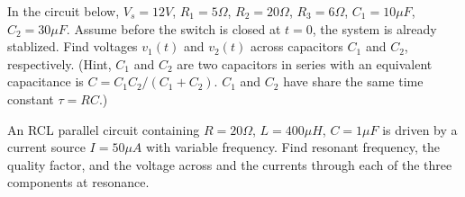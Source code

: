 % 
% 

\item In the circuit below, $V_s=12V$, $R_1=5\Omega$, $R_2=20\Omega$,
$R_3=6\Omega$, $C_1=10\mu F$, $C_2=30\mu F$. Assume before the switch 
is closed at $t=0$, the system is already stablized. Find voltages
$v_1(t)$ and $v_2(t)$ across capacitors $C_1$ and $C_2$, respectively.
(Hint, $C_1$ and $C_2$ are two capacitors in series with an equivalent
capacitance is $C=C_1 C_2/(C_1+C_2)$. $C_1$ and $C_2$ have share the same
time constant $\tau=RC$.)


% 

\item An RCL parallel circuit containing $R=20\Omega$, $L=400 \mu H$,
$C=1 \mu F$ is driven by a current source $I=50 \mu A$ with variable 
frequency. Find resonant frequency, the quality factor, and the voltage
across and the currents through each of the three components at resonance.

% 
 
